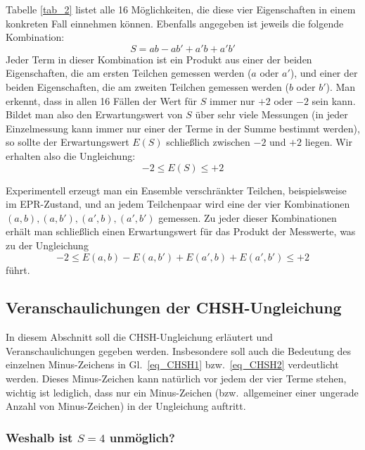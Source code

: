 Tabelle \ref{tab_2} listet alle 16 M\"oglichkeiten, die diese 
vier Eigenschaften in einem konkreten Fall einnehmen k\"onnen.
Ebenfalls angegeben ist jeweils die folgende
Kombination:
\begin{equation}
\label{eq_CHSH1}
     S = ab - ab' + a'b + a'b'  
\end{equation}
Jeder Term in dieser Kombination
ist ein Produkt aus einer der beiden
Eigenschaften, die am ersten Teilchen
gemessen werden
($a$ oder $a'$), und einer der beiden
Eigenschaften, die am zweiten Teilchen
gemessen werden
($b$ oder $b'$). Man erkennt, dass
in allen 16 F\"allen der Wert f\"ur
$S$ immer nur $+2$ oder $-2$ sein
kann. Bildet man also den Erwartungswert
von $S$ \"uber sehr viele Messungen
(in jeder Einzelmessung kann immer
nur einer der Terme in der Summe
bestimmt werden), so sollte der
Erwartungswert $E(S)$ schlie\ss lich zwischen
$-2$ und $+2$ liegen. Wir erhalten also
die Ungleichung:
\begin{equation}   
           -2 \leq E(S) \leq +2 
\end{equation}

Experimentell erzeugt man ein Ensemble 
verschr\"ankter Teilchen, beispielsweise im
EPR-Zustand, und an jedem Teilchenpaar
wird eine der vier Kombinationen $(a,b),(a,b'),(a',b),(a',b')$
gemessen. Zu jeder dieser Kombinationen
erh\"alt man schlie\ss lich einen Erwartungswert
f\"ur das Produkt der Messwerte, was
zu der Ungleichung
\begin{equation}
\label{eq_CHSH2}
     -2 \leq E(a,b) - E(a,b') + E(a',b) + E(a',b') \leq +2 
\end{equation}     
f\"uhrt. 

\subsection{Veranschaulichungen der CHSH-Ungleichung}

In diesem Abschnitt soll die CHSH-Ungleichung erl\"autert und
Veranschaulichungen gegeben werden. Insbesondere soll auch die Bedeutung des
einzelnen Minus-Zeichens in Gl.\ \ref{eq_CHSH1} bzw.\ \ref{eq_CHSH2} verdeutlicht werden.
Dieses Minus-Zeichen kann nat\"urlich vor jedem der vier Terme stehen, wichtig ist
lediglich, dass nur ein Minus-Zeichen (bzw.\ allgemeiner einer ungerade Anzahl von
Minus-Zeichen) in der Ungleichung auftritt. 

\subsubsection{Weshalb ist $S=4$ unm\"oglich?}


